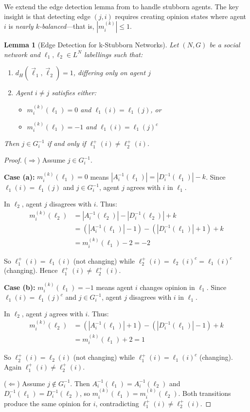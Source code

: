 \documentclass[conference]{IEEEtran}
\newtheorem{lemma}{Lemma}
\begin{document}
We extend the edge detection lemma from \cite{chistikov2020convergence} to handle stubborn agents. The key insight is that detecting edge $(j,i)$ requires creating opinion states where agent $i$ is \emph{nearly $k$-balanced}---that is, $|m_i^{(k)}| \leq 1$.

\begin{lemma}[Edge Detection for k-Stubborn Networks]
\label{lem:edge_detection_stubborn}
Let $(N,G)$ be a social network and $\ell_1, \ell_2 \in L^N$ labellings such that:
\begin{enumerate}
\item $d_H(\vec{\ell}_1, \vec{\ell}_2) = 1$, differing only on agent $j$
\item Agent $i \neq j$ satisfies either:
\begin{itemize}
\item[(a)] $m_i^{(k)}(\ell_1) = 0$ and $\ell_1(i) = \ell_1(j)$, or
\item[(b)] $m_i^{(k)}(\ell_1) = -1$ and $\ell_1(i) = \ell_1(j)^c$
\end{itemize}
\end{enumerate}
Then $j \in G_i^{-1}$ if and only if $\ell_1^+(i) \neq \ell_2^+(i)$.
\end{lemma}

\begin{proof}
($\Rightarrow$) Assume $j \in G_i^{-1}$.

\textbf{Case (a):} $m_i^{(k)}(\ell_1) = 0$ means $|A_i^{-1}(\ell_1)| = |D_i^{-1}(\ell_1)| - k$. Since $\ell_1(i) = \ell_1(j)$ and $j \in G_i^{-1}$, agent $j$ agrees with $i$ in $\ell_1$.

In $\ell_2$, agent $j$ disagrees with $i$. Thus:
\begin{align*}
m_i^{(k)}(\ell_2) &= |A_i^{-1}(\ell_2)| - |D_i^{-1}(\ell_2)| + k \\
&= (|A_i^{-1}(\ell_1)| - 1) - (|D_i^{-1}(\ell_1)| + 1) + k \\
&= m_i^{(k)}(\ell_1) - 2 = -2
\end{align*}

So $\ell_1^+(i) = \ell_1(i)$ (not changing) while $\ell_2^+(i) = \ell_2(i)^c = \ell_1(i)^c$ (changing). Hence $\ell_1^+(i) \neq \ell_2^+(i)$.

\textbf{Case (b):} $m_i^{(k)}(\ell_1) = -1$ means agent $i$ changes opinion in $\ell_1$. Since $\ell_1(i) = \ell_1(j)^c$ and $j \in G_i^{-1}$, agent $j$ disagrees with $i$ in $\ell_1$.

In $\ell_2$, agent $j$ agrees with $i$. Thus:
\begin{align*}
m_i^{(k)}(\ell_2) &= (|A_i^{-1}(\ell_1)| + 1) - (|D_i^{-1}(\ell_1)| - 1) + k \\
&= m_i^{(k)}(\ell_1) + 2 = 1
\end{align*}

So $\ell_2^+(i) = \ell_2(i)$ (not changing) while $\ell_1^+(i) = \ell_1(i)^c$ (changing). Again $\ell_1^+(i) \neq \ell_2^+(i)$.

($\Leftarrow$) Assume $j \notin G_i^{-1}$. Then $A_i^{-1}(\ell_1) = A_i^{-1}(\ell_2)$ and $D_i^{-1}(\ell_1) = D_i^{-1}(\ell_2)$, so $m_i^{(k)}(\ell_1) = m_i^{(k)}(\ell_2)$. Both transitions produce the same opinion for $i$, contradicting $\ell_1^+(i) \neq \ell_2^+(i)$.
\end{proof}
\end{document}
